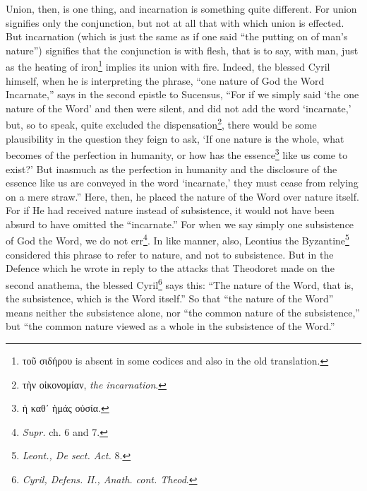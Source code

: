Union, then, is one thing, and incarnation is something quite different. For union signifies only the conjunction, but not at all that with which union is effected. But incarnation (which is just the same as if one said “the putting on of man’s nature”) signifies that the conjunction is with flesh, that is to say, with man, just as the heating of iron\footnote{\textgreek{τοῦ σιδήρου} is absent in some codices and also in the old translation.} implies its union with fire. Indeed, the blessed Cyril himself, when he is interpreting the phrase, “one nature of God the Word Incarnate,” says in the second epistle to Sucensus, “For if we simply said ‘the one nature of the Word’ and then were silent, and did not add the word ‘incarnate,’ but, so to speak, quite excluded the dispensation\footnote{\textgreek{τὴν οἰκονομίαν}, \emph{the incarnation}.}, there would be some plausibility in the question they feign to ask, ‘If one nature is the whole, what becomes of the perfection in humanity, or how has the essence\footnote{\textgreek{ἡ καθ᾽ ἡμάς οὐσία}.} like us come to exist?’ But inasmuch as the perfection in humanity and the disclosure of the essence like us are conveyed in the word ‘incarnate,’ they must cease from relying on a mere straw.” Here, then, he placed the nature of the Word over nature itself. For if He had received nature instead of subsistence, it would not have been absurd to have omitted the “incarnate.” For when we say simply one subsistence of God the Word, we do not err\footnote{\emph{Supr. }ch. 6 and 7.}. In like manner, also, Leontius the Byzantine\footnote{\emph{Leont., De sect. Act. }8.} considered this phrase to refer to nature, and not to subsistence. But in the Defence which he wrote in reply to the attacks that Theodoret made on the second anathema, the blessed Cyril\footnote{\emph{Cyril, Defens. II., Anath. cont. Theod}.} says this: “The nature of the Word, that is, the subsistence, which is the Word itself.” So that “the nature of the Word” means neither the subsistence alone, nor “the common nature of the subsistence,” but “the common nature viewed as a whole in the subsistence of the Word.”

